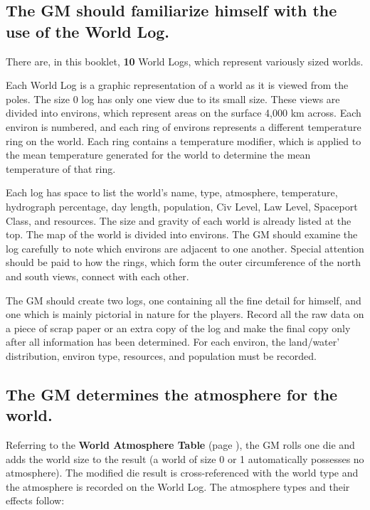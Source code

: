 \subsection[World Log]{The GM should familiarize himself with the
  use of the World Log.}
\label{sec:world-log}

There are, in this booklet, \textbf{10} World Logs, which represent
variously sized worlds.

Each World Log is a graphic representation of a world as it is viewed
from the poles. The size 0 log has only one view due to its small
size. These views are divided into environs, which represent areas on
the surface 4,000 km across. Each environ is numbered, and each ring
of environs represents a different temperature ring on the world. Each
ring contains a temperature modifier, which is applied to the mean
temperature generated for the world to determine the mean temperature
of that ring.

Each log has space to list the world's name, type, atmosphere,
temperature, hydrograph percentage, day length, population, Civ Level,
Law Level, Spaceport Class, and resources. The size and gravity of
each world is already listed at the top.  The map of the world is
divided into environs. The GM should examine the log carefully to note
which environs are adjacent to one another. Special attention should
be paid to how the rings, which form the outer circumference of the
north and south views, connect with each other.

The GM should create two logs, one containing all the fine detail for
himself, and one which is mainly pictorial in nature for the players.
Record all the raw data on a piece of scrap paper or an extra copy of
the log and make the final copy only after all information has been
determined. For each environ, the land/water' distribution, environ
type, resources, and population must be recorded.

\subsection[Atmosphere]{The GM determines the atmosphere for the
  world.}
\label{sec:atmosphere}

Referring to the \textbf{World Atmosphere Table} (page
\pageref{tab:world-atmosphere}), the GM rolls one die and adds the
world size to the result (a world of size 0 or 1 automatically
possesses no atmosphere). The modified die result is cross-referenced
with the world type and the atmosphere is recorded on the World Log.
The atmosphere types and their effects follow:

